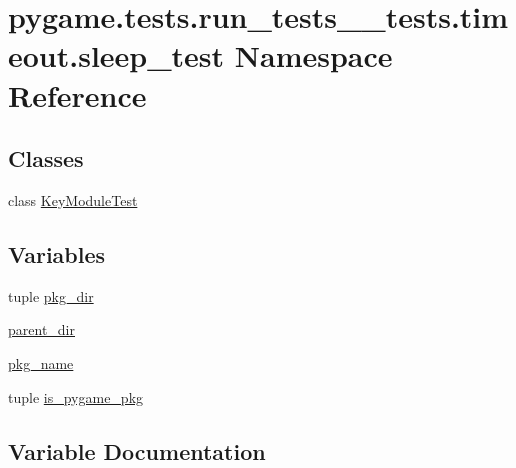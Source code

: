 \hypertarget{namespacepygame_1_1tests_1_1run__tests____tests_1_1timeout_1_1sleep__test}{}\section{pygame.\+tests.\+run\+\_\+tests\+\_\+\+\_\+tests.\+timeout.\+sleep\+\_\+test Namespace Reference}
\label{namespacepygame_1_1tests_1_1run__tests____tests_1_1timeout_1_1sleep__test}
\subsection*{Classes}
\begin{DoxyCompactItemize}
\item 
class \hyperlink{classpygame_1_1tests_1_1run__tests____tests_1_1timeout_1_1sleep__test_1_1_key_module_test}{Key\+Module\+Test}
\end{DoxyCompactItemize}
\subsection*{Variables}
\begin{DoxyCompactItemize}
\item 
tuple \hyperlink{namespacepygame_1_1tests_1_1run__tests____tests_1_1timeout_1_1sleep__test_a10921e790ddfe89c0f9c307dc73218db}{pkg\+\_\+dir}
\item 
\hyperlink{namespacepygame_1_1tests_1_1run__tests____tests_1_1timeout_1_1sleep__test_a95e1b8069ea82981eed7b4530250e513}{parent\+\_\+dir}
\item 
\hyperlink{namespacepygame_1_1tests_1_1run__tests____tests_1_1timeout_1_1sleep__test_a4c1e05d8543b717f71899ef482201b9b}{pkg\+\_\+name}
\item 
tuple \hyperlink{namespacepygame_1_1tests_1_1run__tests____tests_1_1timeout_1_1sleep__test_a8f2c730e2797b783485b0db438f1330b}{is\+\_\+pygame\+\_\+pkg}
\end{DoxyCompactItemize}


\subsection{Variable Documentation}
\mbox{\label{namespacepygame_1_1tests_1_1run__tests____tests_1_1timeout_1_1sleep__test_a8f2c730e2797b783485b0db438f1330b}} 
